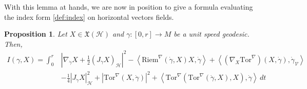 \documentclass[11pt]{article}
\numberwithin{equation}{section}
\newtheorem{proposition}[theorem]{Proposition}
\newcommand{\Ho}{\mathcal H}
\newcommand{\V}{\mathcal V}
\newcommand{\Tor}{\mathrm{Tor}}
\begin{document}
With this lemma at hands, we are now in position to give a formula evaluating the index form \eqref{def:index} on horizontal vectors fields.

\begin{proposition}
Let $X \in \mathfrak{X}(\Ho)$ and $\gamma:[0,r]\to M$ be a unit speed geodesic. Then,
\begin{align*}
I (\gamma,X)   = \int_0^r & \left | \nabla_{\dot \gamma}  X +\frac{1}{2} (J_{\dot \gamma}  X)_\mathcal{H}   \right|^2  -\left \langle \mathrm{Riem}^\nabla(\dot \gamma,X)X, \dot \gamma \right \rangle  +\left\langle (\nabla_X \Tor^\nabla)(X,\dot\gamma),\dot \gamma_\V \right\rangle\\
 &-\frac{1}{4} | J_{\dot \gamma} X|^2_\Ho+ |\Tor^\nabla(X,\dot\gamma)|^2+\left\langle \Tor^\nabla(\Tor^\nabla(\dot\gamma,X),X),\dot \gamma \right\rangle \, dt
\end{align*}
\end{proposition}
\end{document}
